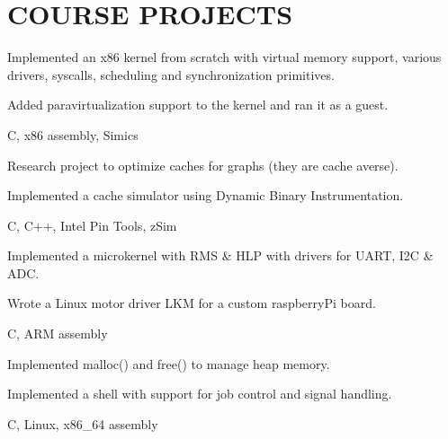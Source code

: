 \documentclass[]{deedy-resume-openfont}
\begin{document}
\begin{minipage}[t]{0.66\textwidth}
\section{COURSE PROJECTS}
\begin{tightemize}
\item Implemented an x86 kernel from scratch with virtual memory support, various drivers, syscalls, scheduling and synchronization primitives.
\item Added paravirtualization support to the kernel and ran it as a guest.
\item C, x86 assembly, Simics
\end{tightemize}
\sectionsep %
\begin{tightemize}
\item Research project to optimize caches for graphs (they are cache averse).
\item Implemented a cache simulator using Dynamic Binary Instrumentation.
\item C, C++, Intel Pin Tools, zSim
\end{tightemize}
\sectionsep %
\begin{tightemize}
\item Implemented a microkernel with RMS \& HLP with drivers for UART, I2C \& ADC.
\item Wrote a Linux motor driver LKM for a custom raspberryPi board.
\item C, ARM assembly
\end{tightemize}
\sectionsep %
\begin{tightemize}
\item Implemented malloc() and free() to manage heap memory.
\item Implemented a shell with support for job control and signal handling.
\item C, Linux, x86\_64 assembly
\end{tightemize}

\end{minipage}
\end{document}
